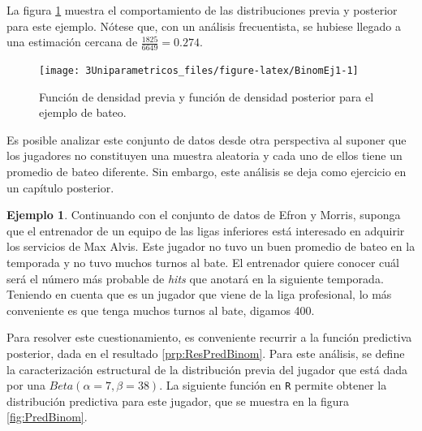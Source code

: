 \documentclass[
  10pt,
  spanish,
]{book}
\theoremstyle{definition}
\theoremstyle{definition}
\newtheorem{example}{Ejemplo}[chapter]
\theoremstyle{definition}
\theoremstyle{definition}
\theoremstyle{remark}
\begin{document}
La figura \ref{fig:BinomEj1} muestra el comportamiento de las distribuciones previa y posterior para este ejemplo. Nótese que, con un análisis frecuentista, se hubiese llegado a una estimación cercana de \(\frac{1825}{6649}=0.274\).

\begin{figure}

{\centering \texttt{[image: 3Uniparametricos\_files/figure-latex/BinomEj1-1]} 

}

\caption{Función de densidad previa y función de densidad posterior para el ejemplo de bateo.}\label{fig:BinomEj1}
\end{figure}

Es posible analizar este conjunto de datos desde otra perspectiva al suponer que los jugadores no constituyen una muestra aleatoria y cada uno de ellos tiene un promedio de bateo diferente. Sin embargo, este análisis se deja como ejercicio en un capítulo posterior.

\begin{example}
\protect\hypertarget{exm:unnamed-chunk-29}{}{\label{exm:unnamed-chunk-29} }Continuando con el conjunto de datos de Efron y Morris, suponga que el entrenador de un equipo de las ligas inferiores está interesado en adquirir los servicios de Max Alvis. Este jugador no tuvo un buen promedio de bateo en la temporada y no tuvo muchos turnos al bate. El entrenador quiere conocer cuál será el número más probable de \emph{hits} que anotará en la siguiente temporada. Teniendo en cuenta que es un jugador que viene de la liga profesional, lo más conveniente es que tenga muchos turnos al bate, digamos 400.

Para resolver este cuestionamiento, es conveniente recurrir a la función predictiva posterior, dada en el resultado \ref{prp:ResPredBinom}. Para este análisis, se define la caracterización estructural de la distribución previa del jugador que está dada por una \(Beta(\alpha=7, \beta=38)\). La siguiente función en \texttt{R} permite obtener la distribución predictiva para este jugador, que se muestra en la figura \ref{fig:PredBinom}.
\end{example}
\end{document}
